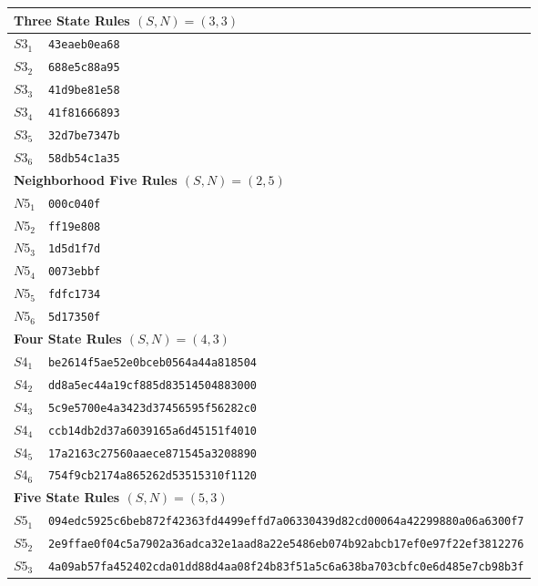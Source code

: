 \documentclass{elsarticle}
\begin{document}
\begin{multicols}{2}
\begin{table}[!htbp] \centering
\small
\begin{tabular}{|p{2cm}|l|}
\hline
\multicolumn{2}{|l|}{\textbf{Three State Rules \boldmath$(S,N) = (3,3)$}} \\ 
\hline
$S3_{1}$ &  \verb|43eaeb0ea68| \\\hline
$S3_{2}$ &  \verb|688e5c88a95| \\ \hline
$S3_{3}$ &  \verb|41d9be81e58| \\ \hline
$S3_{4}$ &  \verb|41f81666893| \\ \hline
$S3_{5}$ &  \verb|32d7be7347b| \\ \hline
$S3_{6}$ &  \verb|58db54c1a35| \\ \hline
\multicolumn{2}{|l|}{\textbf{Neighborhood Five Rules \boldmath$(S,N) = (2,5)$}} 
\\ \hline
$N5_{1}$ &   \verb|000c040f| \\ \hline
$N5_{2}$ &   \verb|ff19e808| \\ \hline
$N5_{3}$ &   \verb|1d5d1f7d| \\ \hline
$N5_{4}$ &   \verb|0073ebbf| \\ \hline
$N5_{5}$ &   \verb|fdfc1734| \\ \hline
$N5_{6}$ &   \verb|5d17350f| \\ \hline
\multicolumn{2}{|l|}{\textbf{Four State Rules \boldmath$(S,N) = (4,3)$}} \\ 
\hline
$S4_{1}$ &   \verb|be2614f5ae52e0bceb0564a44a818504| \\ \hline
$S4_{2}$ &   \verb|dd8a5ec44a19cf885d83514504883000| \\ \hline
$S4_{3}$ &   \verb|5c9e5700e4a3423d37456595f56282c0| \\ \hline
$S4_{4}$ &   \verb|ccb14db2d37a6039165a6d45151f4010| \\ \hline
$S4_{5}$ &   \verb|17a2163c27560aaece871545a3208890| \\ \hline
$S4_{6}$ &   \verb|754f9cb2174a865262d53515310f1120| \\
\hline
\multicolumn{2}{|l|}{\textbf{Five State Rules \boldmath$(S,N) = (5,3)$}} \\ 
\hline
 $S5_{1}$ &
\verb|094edc5925c6beb872f42363fd4499effd7a06330439d82cd00064a42299880a06a6300f7|  
\\
    \hline
    $S5_{2}$ &
\verb|2e9ffae0f04c5a7902a36adca32e1aad8a22e5486eb074b92abcb17ef0e97f22ef3812276| 
\\\hline
$S5_{3}$ & 
\verb|4a09ab57fa452402cda01dd88d4aa08f24b83f51a5c6a638ba703cbfc0e6d485e7cb98b3f| 

\end{tabular}
\end{table}
\end{multicols}
\end{document}
